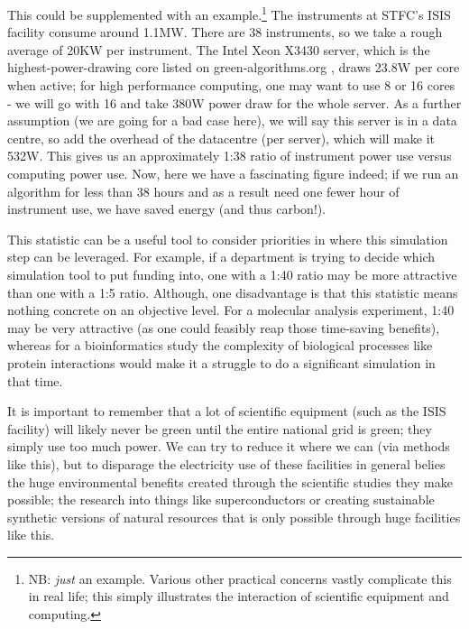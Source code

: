 \documentclass{article}
\begin{document}
This could be supplemented with an example.\footnote{NB: \emph{just} an example. Various other practical concerns vastly complicate this in real life; this simply illustrates the interaction of scientific equipment and computing.} The instruments at STFC's ISIS facility consume around 1.1MW.\citep{findlay2021practical} There are 38 instruments, so we take a rough average of 20KW per instrument. The Intel Xeon X3430 server, which is the highest-power-drawing core listed on green-algorithms.org \citep{lannelongue2021green}, draws 23.8W per core when active; for high performance computing, one may want to use 8 or 16 cores - we will go with 16 and take 380W power draw for the whole server. As a further assumption (we are going for a bad case here), we will say this server is in a data centre, so add the overhead of the datacentre (per server), which will make it 532W. This gives us an approximately 1:38 ratio of instrument power use versus computing power use. Now, here we have a fascinating figure indeed; if we run an algorithm for less than 38 hours and as a result need one fewer hour of instrument use, we have saved energy (and thus carbon!). \newline

This statistic can be a useful tool to consider priorities in where this simulation step can be leveraged. For example, if a department is trying to decide which simulation tool to put funding into, one with a 1:40 ratio may be more attractive than one with a 1:5 ratio. Although, one disadvantage is that this statistic means nothing concrete on an objective level. For a molecular analysis experiment, 1:40 may be very attractive (as one could feasibly reap those time-saving benefits), whereas for a bioinformatics study the complexity of biological processes like protein interactions would make it a struggle to do a significant simulation in that time. \newline

It is important to remember that a lot of scientific equipment (such as the ISIS facility) will likely never be green until the entire national grid is green; they simply use too much power. We can try to reduce it where we can (via methods like this), but to disparage the electricity use of these facilities in general belies the huge environmental benefits created through the scientific studies they make possible; the research into things like superconductors \citep{shang2018time} or creating sustainable synthetic versions of natural resources that is only possible through huge facilities like this.
\end{document}
